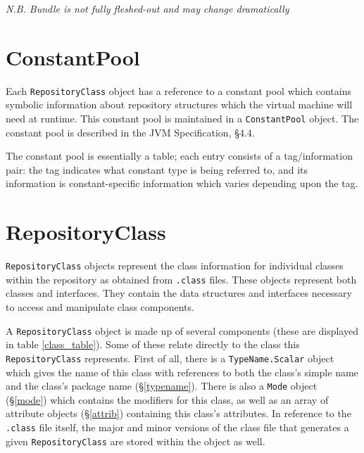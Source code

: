 \documentclass{report}
\begin{document}
\medskip

{\em N.B. Bundle is not fully fleshed-out and may change dramatically}

\section{ConstantPool}\label{pool}

Each \texttt{RepositoryClass} object has a reference to a constant pool
which contains symbolic information about repository structures which the 
virtual machine will need at runtime. This constant pool
is maintained in a \texttt{Con\-stant\-Pool} object. 
The constant pool is described in the JVM Specification, \S 4.4.

The constant pool is essentially a table; each entry consists of a 
tag/infor\-mation pair: the tag indicates what constant type is being referred
to, and its information is constant-specific information which varies depending
upon the tag.




\section{RepositoryClass}\label{repclass}

\texttt{RepositoryClass} objects represent the class information for
individual classes within the repository as obtained from \texttt{.class}
files. These objects represent both classes and interfaces. They contain
the data structures and interfaces necessary to access and manipulate
class components. 

A \texttt{RepositoryClass} object is made up of several components (these are
displayed in table \ref{class_table}). Some
of these relate directly to the class this \texttt{Re\-pos\-i\-tory\-Class} 
represents. First of all, there is a \texttt{TypeName.Scalar} object which 
gives the name of this class with references to both the class's simple name 
and the class's package name (\S \ref{typename}). There is also a 
\texttt{Mode} object (\S \ref{mode}) which contains the modifiers for this 
class, as well as an array of attribute objects (\S \ref{attrib}) containing 
this class's attributes. In reference to the \texttt{.class} file itself, the 
major and minor versions of the class file that generates a given 
\texttt{Re\-pos\-i\-tory\-Class} are stored within the object as well.
\end{document}
